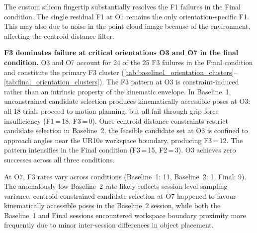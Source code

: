 \documentclass[12pt, a4paper]{report}
\begin{document}
The custom silicon fingertip substantially resolves the F1 failures in the Final condition. The single residual F1 at O1 remains the only orientation-specific F1. This may also due to noise in the point cloud image because of the environment, affecting the centroid distance filter.




\textbf{F3 dominates failure at critical orientations O3 and O7 in the final condition.}
O3 and O7 account for 24 of the 25 F3 failures in the Final condition and constitute the primary F3 cluster (\cref{tab:baseline1_orientation_clusters}--\cref{tab:final_orientation_clusters}).
The F3 pattern at O3 is constraint-induced rather than an intrinsic property of the kinematic envelope. In Baseline~1, unconstrained candidate selection produces kinematically accessible poses at O3: all 18 trials proceed to motion planning, but all fail through grip force insufficiency (F1\,=\,18, F3\,=\,0). Once centroid distance constraints restrict candidate selection in Baseline~2, the feasible candidate set at O3 is confined to approach angles near the UR10e workspace boundary, producing F3\,=\,12. The pattern intensifies in the Final condition (F3\,=\,15, F2\,=\,3). O3 achieves zero successes across all three conditions.

At O7, F3 rates vary across conditions (Baseline~1: 11, Baseline~2: 1, Final: 9). The anomalously low Baseline~2 rate likely reflects session-level sampling variance: centroid-constrained candidate selection at O7 happened to favour kinematically accessible poses in the Baseline~2 session, while both the Baseline~1 and Final sessions encountered workspace boundary proximity more frequently due to minor inter-session differences in object placement.
\end{document}
